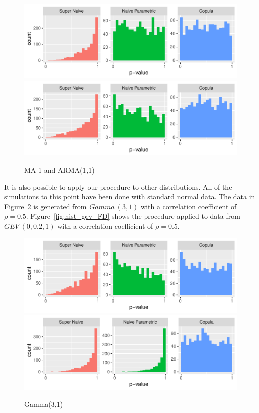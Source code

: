 \documentclass[12pt, letterpaper, titlepage]{article}
\begin{document}
\begin{figure}[tbp]
  \centering
  \includegraphics{hist_ma1_FD}
  \includegraphics{hist_arma_FD}
  \caption{MA-1 and ARMA(1,1)}
  \label{fig:hist_copula_ma1}
\end{figure}


It is also possible to apply our procedure to other distributions. All of the simulations
to this point have been done with standard normal data. The data in Figure~\ref{fig:hist_gamma_FD} 
is generated from $Gamma ~ (3,1)$ with a correlation coefficient of $\rho = 0.5$. Figure~\ref{fig:hist_gev_FD}
shows the procedure applied to data from $GEV ~ (0, 0.2, 1)$ with a correlation coefficient of $\rho = 0.5$. 

\begin{figure}[tbp]
  \centering
  \includegraphics{hist_gamma_FD}
  \includegraphics{hist_gev_FD}
  \caption{Gamma(3,1)}
  \label{fig:hist_gamma_FD}
\end{figure}
\end{document}
